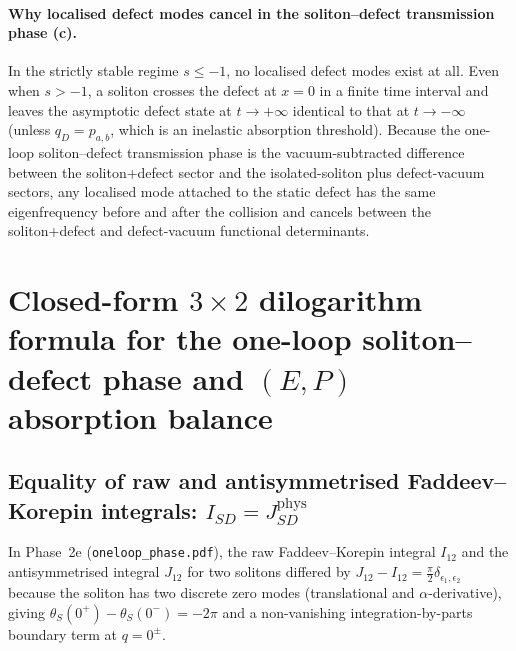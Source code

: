 \documentclass[11pt,a4paper]{article}
\begin{document}
\paragraph{Why localised defect modes cancel in the soliton--defect transmission phase \textbf{(c)}.}
In the strictly stable regime $s \le -1$, no localised defect modes exist at all.
Even when $s > -1$, a soliton crosses the defect at $x=0$ in a finite time
interval and leaves the asymptotic defect state at $t \to +\infty$ identical to
that at $t \to -\infty$ (unless $q_D = p_{a,b}$, which is an inelastic absorption
threshold). Because the one-loop soliton--defect transmission phase is the
vacuum-subtracted difference between the soliton+defect sector and the
isolated-soliton plus defect-vacuum sectors, any localised mode attached to the
static defect has the same eigenfrequency before and after the collision and
cancels between the soliton+defect and defect-vacuum functional determinants.

\section{Closed-form $3\times 2$ dilogarithm formula for the one-loop soliton--defect phase and $(E,P)$ absorption balance}
\label{sec:phase}

\subsection{Equality of raw and antisymmetrised Faddeev--Korepin integrals: $I_{SD} = J_{SD}^{\mathrm{phys}}$}

In Phase~2e (\texttt{oneloop\_phase.pdf}), the raw Faddeev--Korepin integral
$I_{12}$ and the antisymmetrised integral $J_{12}$ for two solitons differed by
$J_{12} - I_{12} = \frac{\pi}{2}\delta_{\epsilon_1,\epsilon_2}$ because the
soliton has two discrete zero modes (translational and $\alpha$-derivative), giving
$\theta_S(0^+) - \theta_S(0^-) = -2\pi$ and a non-vanishing integration-by-parts
boundary term at $q = 0^\pm$.
\end{document}
